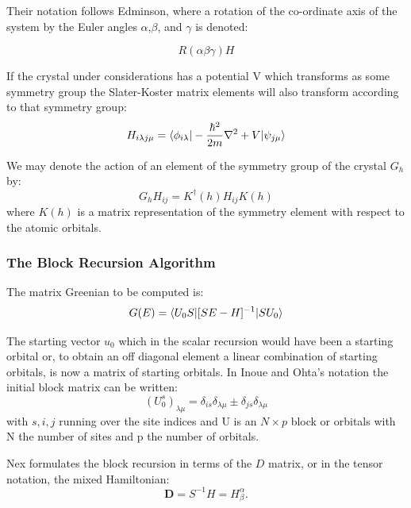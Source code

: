 Their notation follows Edminson, where a rotation of the co-ordinate axis
of the system by the Euler angles $\alpha$,$\beta$, and $\gamma$ is denoted:

\begin{equation}
R(\alpha\beta\gamma)H
\end{equation}

If the crystal under considerations has a potential V which transforms as some symmetry group
the Slater-Koster matrix elements will also transform according to that symmetry group:
%
\begin{equation}
H_{i\lambda j\mu} = \langle \phi_{i\lambda} | -\frac{\hbar^{2}}{2m}\nabla^{2} + V|\psi_{j\mu} \rangle
\end{equation}
%

%
We may denote the action of an element of the symmetry group of the crystal $G_{h}$ by:
%
\begin{equation}
G_{h} H_{ij} =  K^{\dagger}(h)H_{ij}K(h)
\end{equation}
%
where $K(h)$ is a matrix representation of the symmetry element 
with respect to the atomic orbitals. 

\subsubsection{The Block Recursion Algorithm}
\label{sec:blockrecursion}
The matrix Greenian to be computed is:
\begin{equation}
G(E) = \langle U_{0}S|[SE-H]^{-1}|SU_{0}\rangle
\end{equation}

The starting vector $u_{0}$ which in the scalar recursion
would have been a starting orbital or, to obtain an off diagonal
element a linear combination of starting orbitals, is now a matrix
of starting orbitals. In Inoue and Ohta's notation the initial block
matrix can be written:
%
\begin{equation}
(U^{s}_{0})_{\lambda\mu} = \delta_{is}\delta_{\lambda\mu} \pm \delta_{js}\delta_{\lambda\mu}
\end{equation}
%
with $s,i,j$ running over the site indices and  U is an $N\times p$ block or orbitals
with N the number of sites and p the number of orbitals.

Nex formulates the block recursion in terms of the 
$D$ matrix, or in the tensor notation, the mixed Hamiltonian:
%
\begin{equation}
\mathbf{D} = S^{-1}H = H^{\alpha}_{\beta}.
\end{equation}
%

